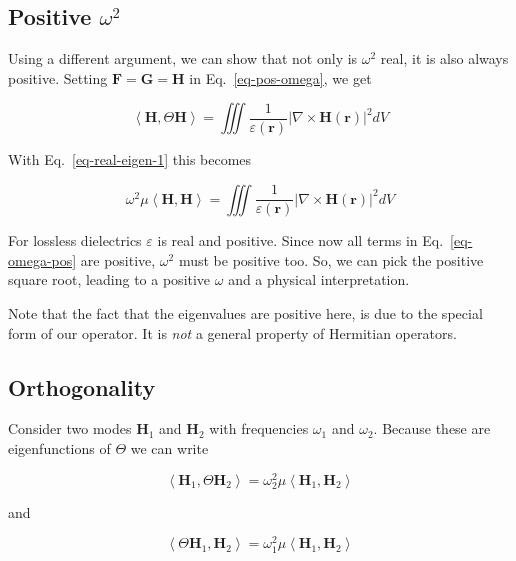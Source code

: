 \subsection{Positive $\omega^2$}

Using a different argument, we can show that not only is $\omega^2$ real, it is also always positive. Setting ${\mathbf F}={\mathbf G}={\mathbf H}$ in Eq.~\ref{eq-pos-omega}, we get

\begin{equation}
\left\langle {\mathbf H}, \Theta {\mathbf H}\right\rangle = \iiint \frac{1}{\varepsilon({\mathbf r})} \left | \nabla \times {\mathbf H({\mathbf r})} \right |^2  dV 
\label{eq-rot-H-bis}
\end{equation} 

With Eq.~\ref{eq-real-eigen-1} this becomes

\begin{equation}
\omega^2 \mu \left\langle {\mathbf H} , {\mathbf H}\right\rangle = \iiint \frac{1}{\varepsilon({\mathbf r})} \left | \nabla \times {\mathbf H({\mathbf r})} \right |^2  dV \label{eq-omega-pos}
\end{equation} 

For lossless dielectrics $\varepsilon$ is real and positive. Since now all terms in Eq.~\ref{eq-omega-pos} are positive, $\omega^2$ must be positive too. So, we can pick the positive square root, leading to a positive $\omega$ and a physical interpretation.

Note that the fact that the eigenvalues are positive here, is due to the special form of our operator. It is \emph{not} a general property of Hermitian operators.

\subsection{Orthogonality}

Consider two modes ${\mathbf H}_1$ and ${\mathbf H}_2$ with frequencies $\omega_1$ and $\omega_2$. Because these are eigenfunctions of $\Theta$ we can write

\begin{equation}
 \left\langle {\mathbf H}_1 , \Theta {\mathbf H}_2\right\rangle = \omega_2^2 \mu \left\langle {\mathbf H}_1 , {\mathbf H}_2\right\rangle 
\label{eq-ortho-1}
\end{equation}

and

\begin{equation}
 \left\langle \Theta {\mathbf H}_1 , {\mathbf H}_2\right\rangle = \omega_1^2 \mu \left\langle {\mathbf H}_1 , {\mathbf H}_2\right\rangle
\label{eq-ortho-2}
\end{equation}

